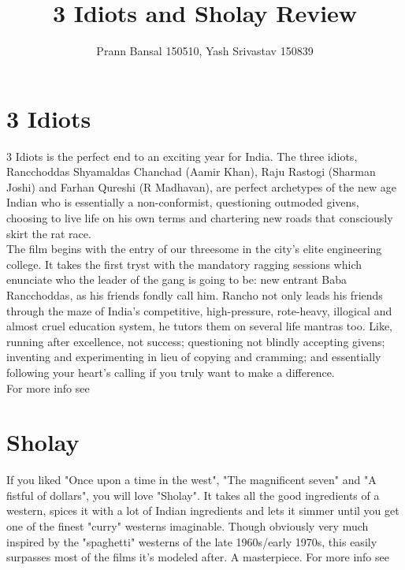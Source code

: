 \documentclass{article}
\title{3 Idiots and Sholay Review}
\author{Prann Bansal 150510, Yash Srivastav 150839}
\begin{document}
\maketitle

\section{3 Idiots}
3 Idiots is the perfect end to an exciting year for India. The three idiots, Rancchoddas Shyamaldas Chanchad (Aamir Khan), Raju Rastogi (Sharman Joshi) and Farhan Qureshi (R Madhavan), are perfect archetypes of the new age Indian who is essentially a non-conformist, questioning outmoded givens, choosing to live life on his own terms and chartering new roads that consciously skirt the rat race.\\
 The film begins with the entry of our threesome in the city's elite engineering college. It takes the first tryst with the mandatory ragging sessions which enunciate who the leader of the gang is going to be: new entrant Baba Rancchoddas, as his friends fondly call him. Rancho not only leads his friends through the maze of India's competitive, high-pressure, rote-heavy, illogical and almost cruel education system, he tutors them on several life mantras too. Like, running after excellence, not success; questioning not blindly accepting givens; inventing and experimenting in lieu of copying and cramming; and essentially following your heart's calling if you truly want to make a difference.\\

For more info see \cite{indiatimes-article}

\section{Sholay}
If you liked "Once upon a time in the west", "The magnificent seven" and "A fistful of dollars", you will love "Sholay". It takes all the good ingredients of a western, spices it with a lot of Indian ingredients and lets it simmer until you get one of the finest "curry" westerns imaginable. Though obviously very much inspired by the "spaghetti" westerns of the late 1960s/early 1970s, this easily surpasses most of the films it's modeled after. A masterpiece.
For more info see \cite{imdb-article}




\end{document}
